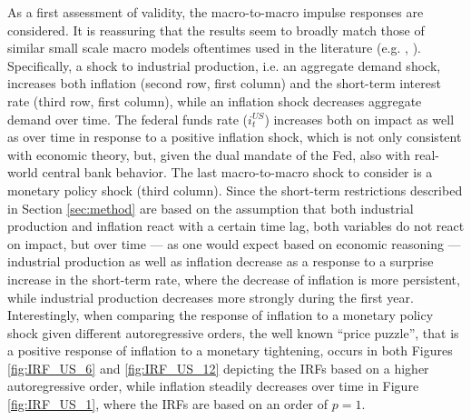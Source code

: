 

As a first assessment of validity, the macro-to-macro impulse responses are considered. 
It is reassuring that the results seem to broadly match those of similar small scale macro models oftentimes used in the literature (e.g. \citet{gali_1992}, \citet{stock2001vector}). 
Specifically, a shock to industrial production, i.e. an aggregate demand shock, increases both inflation (second row, first column) and the short-term interest rate (third row, first column), while an inflation shock decreases aggregate demand over time. 
The federal funds rate ($i^{US}_{t}$) increases both on impact as well as over time in response to a positive inflation shock, which is not only consistent with economic theory, but, given the dual mandate of the Fed, also with real-world central bank behavior.
The last macro-to-macro shock to consider is a monetary policy shock (third column). 
Since the short-term restrictions described in Section \ref{sec:method} are based on the assumption that both industrial production and inflation react with a certain time lag, both variables do not react on impact, but over time --- as one would expect based on economic reasoning --- industrial production as well as inflation decrease as a response to a surprise increase in the short-term rate, where the decrease of inflation is more persistent, while industrial production decreases more strongly during the first year. 
Interestingly, when comparing the response of inflation to a monetary policy shock given different autoregressive orders, the well known ``price puzzle'', that is a positive response of inflation to a monetary tightening, occurs in both Figures \ref{fig:IRF_US_6} and \ref{fig:IRF_US_12} depicting the IRFs based on a higher autoregressive order, while inflation steadily decreases over time in Figure \ref{fig:IRF_US_1}, where the IRFs are based on an order of $p=1$.

